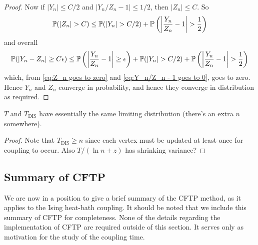 \begin{proof}
		Now if $|Y_n| \leq C/2$ and $|Y_n/Z_n - 1| \leq 1/2$, then $|Z_n| \leq C$. So
		\begin{equation}
			\mathbb{P}(|Z_n| > C) \leq \mathbb{P}(|Y_n| > C/2) + \mathbb{P}\left(\left|\frac{Y_n}{Z_n} - 1\right| > \frac{1}{2}\right)
		\end{equation}
		and overall
		\begin{equation}
			\mathbb{P}(|Y_n - Z_n| \geq C\epsilon) \leq \mathbb{P}\left(\left|\frac{Y_n}{Z_n} - 1\right| \geq \epsilon \right) + \mathbb{P}(|Y_n| > C/2) + \mathbb{P}\left(\left|\frac{Y_n}{Z_n} - 1\right| > \frac{1}{2}\right)
		\end{equation}
		which, from \eqref{eq:Z_n goes to zero} and \eqref{eq:Y_n/Z_n - 1 goes to 0}, goes to zero. Hence $Y_n$ and $Z_n$ converge in probability, and hence they converge in distribution as required.
	\end{proof}

	\begin{corollary}
		$T$ and $T_\mathrm{DIS}$ have essentially the same limiting distribution (there's an extra $n$ somewhere).
	\end{corollary}
	\begin{proof}
		Note that $T_\mathrm{DIS} \geq n$ since each vertex must be updated at least once for coupling to occur.
		Also $T/(\ln n + z)$ has shrinking variance?
	\end{proof}

	\subsection{Summary of CFTP}
	\label{sec:summary of CFTP}
	We are now in a position to give a brief summary of the CFTP method, as it applies to the Ising heat-bath coupling. It should be noted that we include this summary of CFTP for completeness. None of the details regarding the implementation of CFTP are required outside of this section. It serves only as motivation for the study of the coupling time.

